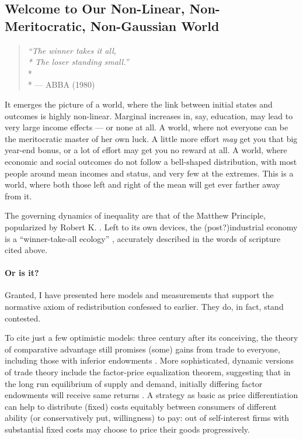 \subsection[Our Non-Linear/Meritocratic/Gaussian World]{Welcome to Our Non-Linear, Non-Meritocratic, Non-Gaussian World}

\begin{quote}
	\emph{``The winner takes it all,\\*
	The loser standing small.''}\\*\\*
	--- ABBA (1980)
\end{quote}

It emerges the picture of a world, where the link between initial states and outcomes is highly non-linear. Marginal increases in, say, education, may lead to very large income effects --- or none at all. A world, where not everyone can be the meritocratic master of her own luck. A little more effort \emph{may} get you that big year-end bonus, or a lot of effort may get you no reward at all. A world, where economic and social outcomes do not follow a bell-shaped distribution, with most people around mean incomes and status, and very few at the extremes. This is a world, where both those left and right of the mean will get ever farther away from it.

The governing dynamics of inequality are that of the Matthew Principle, popularized by Robert K. \cite{Merton1988, Jackson1968}. Left to its own devices, the (post?)industrial economy is a ``winner-take-all ecology'' \citep{Taleb2007}, accurately described in the words of scripture cited above.

\paragraph{Or is it?} Granted, I have presented here models and measurements that support the normative axiom of redistribution confessed to earlier. They do, in fact, stand contested.

To cite just a few optimistic models: three century after its conceiving, the theory of comparative advantage still promises (some) gains from trade to everyone, including those with inferior endowments \citep{Ricardo1817}. More sophisticated, dynamic versions of trade theory include the factor-price equalization theorem, suggesting that in the long run equilibrium of supply and demand, initially differing factor endowments will receive same returns \citep{Stolper1941}. A strategy as basic as price differentiation can help to distribute (fixed) costs equitably between consumers of different ability (or conservatively put, willingness) to pay: out of self-interest firms with substantial fixed costs may choose to price their goods progressively.

